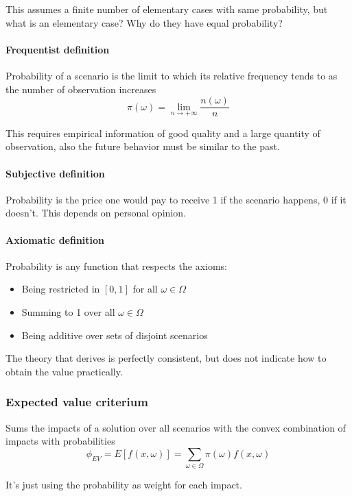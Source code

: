 This assumes a finite number of elementary cases with same probability, but what is an elementary case? Why do they have equal probability?

\paragraph{Frequentist definition} Probability of a scenario is the limit to which its relative frequency tends to as the number of observation increases
$$ \pi (\omega) = \lim_{n \rightarrow + \infty} \frac{n (\omega)}{n} $$

This requires empirical information of good quality and a large quantity of observation, also the future behavior must be similar to the past.

\paragraph{Subjective definition} Probability is the price one would pay to receive 1 if the scenario happens, 0 if it doesn't. This depends on personal opinion.

\paragraph{Axiomatic definition} Probability is any function that respects the axioms: 
\begin{itemize}
	\item Being restricted in $[0,1]$ for all $\omega \in \Omega$
	
	\item Summing to 1 over all $\omega \in \Omega$
	
	\item Being additive over sets of disjoint scenarios 
\end{itemize}

The theory that derives is perfectly consistent, but does not indicate how to obtain the value practically.

\subsubsection{Expected value criterium}

Sums the impacts of a solution over all scenarios with the convex combination of impacts with probabilities
$$ \phi_{EV} = E \left[f(x, \omega)\right] = \sum_{\omega \in \Omega} \pi (\omega) f (x, \omega) $$

It's just using the probability as weight for each impact.

